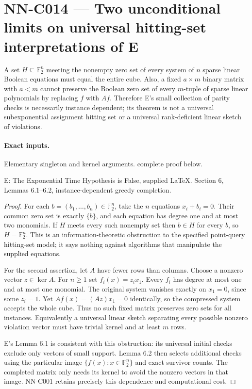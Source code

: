 \section{NN-C014 --- Two unconditional limits on universal hitting-set interpretations of E}
\begin{proposition}[NN-C014]
A set $H\subseteq\mathbb F_2^n$ meeting the nonempty zero set of every system of $n$ sparse linear Boolean equations must equal the entire cube. Also, a fixed $a\times m$ binary matrix with $a<m$ cannot preserve the Boolean zero set of every $m$-tuple of sparse linear polynomials by replacing $f$ with $Af$. Therefore E's small collection of parity checks is necessarily instance dependent; its theorem is not a universal subexponential assignment hitting set or a universal rank-deficient linear sketch of violations.
\end{proposition}
\paragraph{Exact inputs.}
Elementary singleton and kernel arguments. complete proof below.

E: The Exponential Time Hypothesis is False, supplied LaTeX. Section 6, Lemmas 6.1--6.2, instance-dependent greedy completion.

\begin{proof}
For each $b=(b_1,\ldots,b_n)\in\mathbb F_2^n$, take the $n$ equations $x_i+b_i=0$. Their common zero set is exactly $\{b\}$, and each equation has degree one and at most two monomials. If $H$ meets every such nonempty set then $b\in H$ for every $b$, so $H=\mathbb F_2^n$. This is an information-theoretic obstruction to the specified point-query hitting-set model; it says nothing against algorithms that manipulate the supplied equations.

For the second assertion, let $A$ have fewer rows than columns. Choose a nonzero vector $z\in\ker A$. For $n\geq1$ set $f_i(x)=z_i x_1$. Every $f_i$ has degree at most one and at most one monomial. The original system vanishes exactly on $x_1=0$, since some $z_i=1$. Yet $Af(x)=(Az)x_1=0$ identically, so the compressed system accepts the whole cube. Thus no such fixed matrix preserves zero sets for all instances. Equivalently a universal linear sketch separating every possible nonzero violation vector must have trivial kernel and at least $m$ rows.

E's Lemma 6.1 is consistent with this obstruction: its universal initial checks exclude only vectors of small support. Lemma 6.2 then selects additional checks using the particular image $\{f(x):x\in\mathbb F_2^n\}$ and exact survivor counts. The completed matrix only needs its kernel to avoid the nonzero vectors in that image. NN-C001 retains precisely this dependence and computational cost.
\end{proof}
